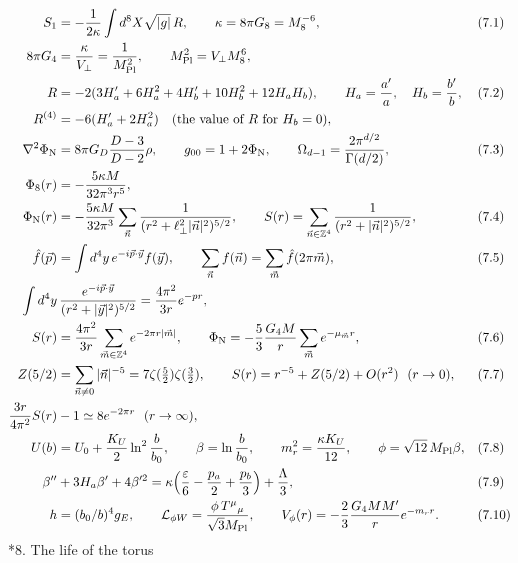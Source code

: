 \documentclass[10pt,a4paper]{article}
\makeatletter
\renewcommand\section{\@startsection{section}{1}{\z@}{-3.5ex \@plus -1ex \@minus -.2ex}{2.3ex \@plus.2ex}{\normalfont\Large\bfseries\raggedright}}
\makeatother
\begin{document}
\begin{align*}
S_1&=-\frac1{2\kappa}\int d^8X\sqrt{|g|}\,R,\qquad \kappa=8\pi G_8=M_8^{-6},&&(7.1) \\
8\pi G_4&=\frac\kappa{V_\perp}=\frac1{M_{\rm Pl}^2},\qquad M_{\rm Pl}^2=V_\perp M_8^6, \\
R&=-2(3H_a'+6H_a^2+4H_b'+10H_b^2+12H_aH_b),\qquad H_a=\frac{a'}a,\quad H_b=\frac{b'}b,&&(7.2) \\
R^{(4)}&=-6(H_a'+2H_a^2)\quad(\text{the value of }R\text{ for }H_b=0), \\
\nabla^2\Phi_{\rm N}&=8\pi G_D\frac{D-3}{D-2}\rho,\qquad g_{00}=1+2\Phi_{\rm N},\qquad \Omega_{d-1}=\frac{2\pi^{d/2}}{\Gamma(d/2)},&&(7.3) \\
\Phi_8(r)&=-\frac{5\kappa M}{32\pi^3r^5}, \\
\Phi_{\rm N}(r)&=-\frac{5\kappa M}{32\pi^3}\sum_{\vec n}\frac1{(r^2+\ell_\perp^2|\vec n|^2)^{5/2}},\qquad S(r)=\sum_{\vec n\in\mathbb Z^4}\frac1{(r^2+|\vec n|^2)^{5/2}},&&(7.4) \\
\hat f(\vec p)&=\int d^4y\,e^{-i\vec p\cdot\vec y}f(\vec y),\qquad \sum_{\vec n}f(\vec n)=\sum_{\vec m}\hat f(2\pi\vec m),&&(7.5) \\
\int d^4y&\,\frac{e^{-i\vec p\cdot\vec y}}{(r^2+|\vec y|^2)^{5/2}}=\frac{4\pi^2}{3r}e^{-pr}, \\
S(r)&=\frac{4\pi^2}{3r}\sum_{\vec m\in\mathbb Z^4}e^{-2\pi r|\vec m|},\qquad \Phi_{\rm N}=-\frac53\frac{G_4M}r\sum_{\vec m}e^{-\mu_{\vec m}r},&&(7.6) \\
Z(5/2)&=\sum_{\vec n\ne0}|\vec n|^{-5}=7\zeta(\tfrac52)\zeta(\tfrac32),\qquad S(r)=r^{-5}+Z(5/2)+O(r^2)\ \ (r\to0),&&(7.7) \\
\frac{3r}{4\pi^2}S(r)&-1\simeq8e^{-2\pi r}\ \ (r\to\infty), \\
U(b)&=U_0+\frac{K_U}2\ln^2\frac b{b_0},\qquad \beta=\ln\frac b{b_0},\qquad m_r^2=\frac{\kappa K_U}{12},\qquad \phi=\sqrt{12}\,M_{\rm Pl}\beta,&&(7.8) \\
\beta''&+3H_a\beta'+4\beta'^2=\kappa\Big(\frac\varepsilon6-\frac{p_a}2+\frac{p_b}3\Big)+\frac\Lambda3,&&(7.9) \\
h&=(b_0/b)^4g_E,\qquad \mathcal L_{\phi W}=\frac{\phi\,T^\mu{}_\mu}{\sqrt3M_{\rm Pl}},\qquad V_\phi(r)=-\frac23\frac{G_4MM'}re^{-m_rr}.&&(7.10)
\end{align*}
\section*{8. The life of the torus}
\end{document}
